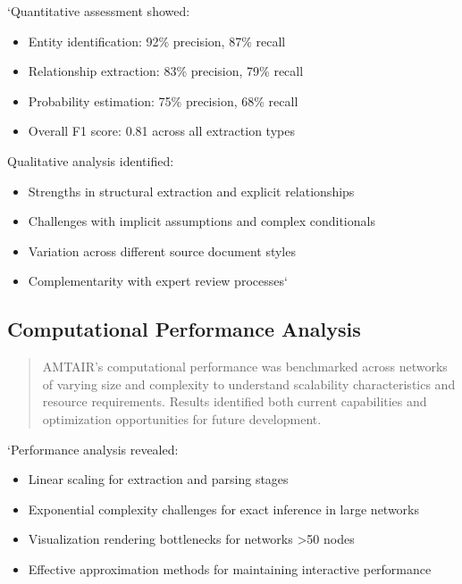 \documentclass[12pt,a4paper]{report}
\providecommand{\tightlist}{%
  \setlength{\itemsep}{0pt}\setlength{\parskip}{0pt}}
\begin{document}
`Quantitative assessment showed:

\begin{itemize}
\tightlist
\item
  Entity identification: 92\% precision, 87\% recall
\item
  Relationship extraction: 83\% precision, 79\% recall
\item
  Probability estimation: 75\% precision, 68\% recall
\item
  Overall F1 score: 0.81 across all extraction types
\end{itemize}

Qualitative analysis identified:

\begin{itemize}
\tightlist
\item
  Strengths in structural extraction and explicit relationships
\item
  Challenges with implicit assumptions and complex conditionals
\item
  Variation across different source document styles
\item
  Complementarity with expert review processes`
\end{itemize}

\subsection{Computational Performance
Analysis}\label{sec-computational-performance}

\begin{quote}
AMTAIR's computational performance was benchmarked across networks of
varying size and complexity to understand scalability characteristics
and resource requirements. Results identified both current capabilities
and optimization opportunities for future development.
\end{quote}

`Performance analysis revealed:

\begin{itemize}
\tightlist
\item
  Linear scaling for extraction and parsing stages
\item
  Exponential complexity challenges for exact inference in large
  networks
\item
  Visualization rendering bottlenecks for networks \textgreater50 nodes
\item
  Effective approximation methods for maintaining interactive
  performance
\end{itemize}
\end{document}
